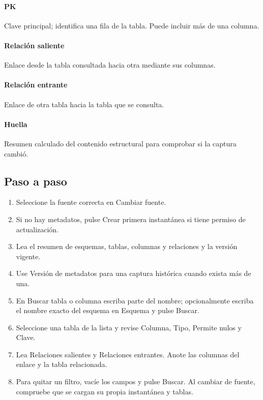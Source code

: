 \paragraph{PK} Clave principal; identifica una fila de la tabla. Puede incluir más de una columna.

\paragraph{Relación saliente} Enlace desde la tabla consultada hacia otra mediante sus columnas.

\paragraph{Relación entrante} Enlace de otra tabla hacia la tabla que se consulta.

\paragraph{Huella} Resumen calculado del contenido estructural para comprobar si la captura cambió.

\subsection{Paso a paso}
\begin{enumerate}
\item Seleccione la fuente correcta en Cambiar fuente.
\item Si no hay metadatos, pulse Crear primera instantánea si tiene permiso de actualización.
\item Lea el resumen de esquemas, tablas, columnas y relaciones y la versión vigente.
\item Use Versión de metadatos para una captura histórica cuando exista más de una.
\item En Buscar tabla o columna escriba parte del nombre; opcionalmente escriba el nombre exacto del esquema en Esquema y pulse Buscar.
\item Seleccione una tabla de la lista y revise Columna, Tipo, Permite nulos y Clave.
\item Lea Relaciones salientes y Relaciones entrantes. Anote las columnas del enlace y la tabla relacionada.
\item Para quitar un filtro, vacíe los campos y pulse Buscar. Al cambiar de fuente, compruebe que se cargan su propia instantánea y tablas.
\end{enumerate}

